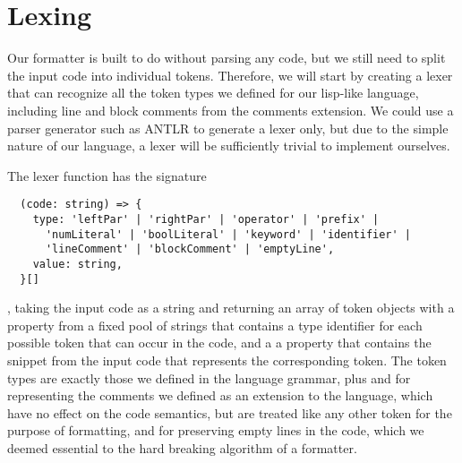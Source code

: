 \section{Lexing}
Our formatter is built to do without parsing any code,
but we still need to split the input code into individual tokens.
Therefore, we will start by creating a lexer that can recognize
all the token types we defined for our lisp-like language,
including line and block comments from the comments extension.
We could use a parser generator such as ANTLR to generate a lexer only,
but due to the simple nature of our language,
a lexer will be sufficiently trivial to implement ourselves.

The lexer function has the signature
\begin{verbatim}
  (code: string) => {
    type: 'leftPar' | 'rightPar' | 'operator' | 'prefix' |
      'numLiteral' | 'boolLiteral' | 'keyword' | 'identifier' |
      'lineComment' | 'blockComment' | 'emptyLine',
    value: string,
  }[]
\end{verbatim}
, taking the input code as a string and returning an array of
token objects with a property  from a fixed pool of
strings that contains a type identifier
for each possible token that can occur in the code,
and a a property  that contains the
snippet from the input code that represents the corresponding token.
The token types are exactly those we defined in the language grammar,
plus  and 
for representing the comments we defined as an extension to the language,
which have no effect on the code semantics,
but are treated like any other token for the purpose of formatting,
and  for preserving empty lines in the code,
which we deemed essential to the hard breaking algorithm of a formatter.




















